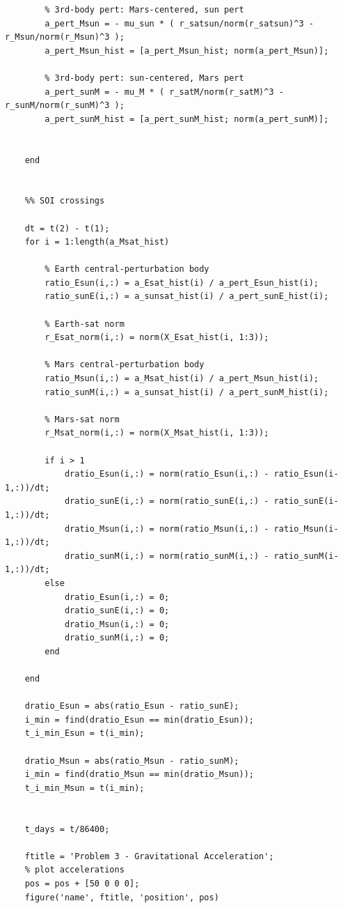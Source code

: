 \documentclass[conf]{new-aiaa}
\begin{document}
\begin{lstlisting}
        % 3rd-body pert: Mars-centered, sun pert 
        a_pert_Msun = - mu_sun * ( r_satsun/norm(r_satsun)^3 - r_Msun/norm(r_Msun)^3 );
        a_pert_Msun_hist = [a_pert_Msun_hist; norm(a_pert_Msun)]; 
        
        % 3rd-body pert: sun-centered, Mars pert 
        a_pert_sunM = - mu_M * ( r_satM/norm(r_satM)^3 - r_sunM/norm(r_sunM)^3 ); 
        a_pert_sunM_hist = [a_pert_sunM_hist; norm(a_pert_sunM)]; 
    
        
    end 
            
            
    %% SOI crossings 
    
    dt = t(2) - t(1); 
    for i = 1:length(a_Msat_hist)
        
        % Earth central-perturbation body 
        ratio_Esun(i,:) = a_Esat_hist(i) / a_pert_Esun_hist(i); 
        ratio_sunE(i,:) = a_sunsat_hist(i) / a_pert_sunE_hist(i); 
        
        % Earth-sat norm 
        r_Esat_norm(i,:) = norm(X_Esat_hist(i, 1:3)); 
        
        % Mars central-perturbation body 
        ratio_Msun(i,:) = a_Msat_hist(i) / a_pert_Msun_hist(i); 
        ratio_sunM(i,:) = a_sunsat_hist(i) / a_pert_sunM_hist(i); 
        
        % Mars-sat norm 
        r_Msat_norm(i,:) = norm(X_Msat_hist(i, 1:3)); 
        
        if i > 1
            dratio_Esun(i,:) = norm(ratio_Esun(i,:) - ratio_Esun(i-1,:))/dt; 
            dratio_sunE(i,:) = norm(ratio_sunE(i,:) - ratio_sunE(i-1,:))/dt; 
            dratio_Msun(i,:) = norm(ratio_Msun(i,:) - ratio_Msun(i-1,:))/dt; 
            dratio_sunM(i,:) = norm(ratio_sunM(i,:) - ratio_sunM(i-1,:))/dt; 
        else
            dratio_Esun(i,:) = 0; 
            dratio_sunE(i,:) = 0; 
            dratio_Msun(i,:) = 0; 
            dratio_sunM(i,:) = 0; 
        end 
        
    end 
    
    dratio_Esun = abs(ratio_Esun - ratio_sunE); 
    i_min = find(dratio_Esun == min(dratio_Esun)); 
    t_i_min_Esun = t(i_min); 
    
    dratio_Msun = abs(ratio_Msun - ratio_sunM); 
    i_min = find(dratio_Msun == min(dratio_Msun)); 
    t_i_min_Msun = t(i_min); 
    
    
    t_days = t/86400; 
    
    ftitle = 'Problem 3 - Gravitational Acceleration'; 
    % plot accelerations 
    pos = pos + [50 0 0 0]; 
    figure('name', ftitle, 'position', pos)
    

\end{lstlisting}
\end{document}
